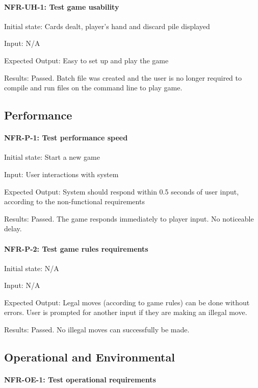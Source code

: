 \documentclass[12pt, titlepage]{article}
\begin{document}
\paragraph{NFR-UH-1: Test game usability\\}

Initial state: Cards dealt, player's hand and discard pile displayed

Input: N/A

Expected Output: Easy to set up and play the game

Results: Passed. Batch file was created and the user is no longer required to compile and run files on the command line to play game.

\subsection{Performance}
\paragraph{NFR-P-1: Test performance speed\\}

Initial state: Start a new game 

Input: User interactions with system

Expected Output: System should respond within 0.5 seconds of user input, according to the non-functional requirements

Results: Passed. The game responds immediately to player input. No noticeable delay.

\paragraph{NFR-P-2: Test game rules requirements\\}

Initial state: N/A

Input: N/A

Expected Output: Legal moves (according to game rules) can be done without errors. User is prompted for another input if they are making an illegal move.

Results: Passed. No illegal moves can successfully be made.

\subsection{Operational and Environmental}

\paragraph{NFR-OE-1: Test operational requirements\\}
\end{document}
